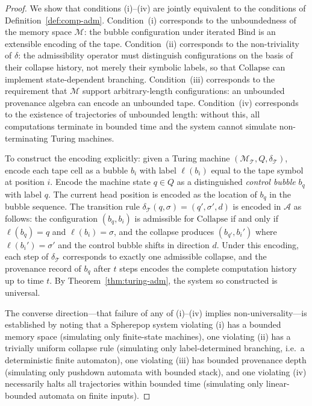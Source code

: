 \documentclass[11pt, oneside]{article}
\numberwithin{equation}{section}
\theoremstyle{rsvpstyle}
\theoremstyle{remark}
\begin{document}
\begin{proof}
We show that conditions (i)--(iv) are jointly equivalent to the conditions of
Definition~\ref{def:comp-adm}. Condition~(i) corresponds to the unboundedness
of the memory space $\mathcal{M}$: the bubble configuration under iterated $\mathrm{Bind}$
is an extensible encoding of the tape. Condition~(ii) corresponds to the non-triviality
of $\delta$: the admissibility operator must distinguish configurations on the basis
of their collapse history, not merely their symbolic labels, so that $\mathrm{Collapse}$
can implement state-dependent branching. Condition~(iii) corresponds to the requirement
that $\mathcal{M}$ support arbitrary-length configurations: an unbounded provenance
algebra can encode an unbounded tape. Condition~(iv) corresponds to the existence
of trajectories of unbounded length: without this, all computations terminate in
bounded time and the system cannot simulate non-terminating Turing machines.

To construct the encoding explicitly: given a Turing machine $(\mathcal{M}_\mathcal{T},
Q, \delta_\mathcal{T})$, encode each tape cell as a bubble $b_i$ with label $\ell(b_i)$
equal to the tape symbol at position $i$. Encode the machine state $q \in Q$ as a
distinguished \emph{control bubble} $b_q$ with label $q$. The current head position
is encoded as the location of $b_q$ in the bubble sequence. The transition rule
$\delta_\mathcal{T}(q, \sigma) = (q', \sigma', d)$ is encoded in $\mathcal{A}$
as follows: the configuration $(b_q, b_i)$ is admissible for $\mathrm{Collapse}$
if and only if $\ell(b_q) = q$ and $\ell(b_i) = \sigma$, and the collapse produces
$(b_{q'}, b_i')$ where $\ell(b_i') = \sigma'$ and the control bubble shifts in
direction $d$. Under this encoding, each step of $\delta_\mathcal{T}$ corresponds
to exactly one admissible collapse, and the provenance record of $b_q$ after $t$
steps encodes the complete computation history up to time $t$. By
Theorem~\ref{thm:turing-adm}, the system so constructed is universal.

The converse direction---that failure of any of (i)--(iv) implies non-universality---is
established by noting that a Spherepop system violating (i) has a bounded memory
space (simulating only finite-state machines), one violating (ii) has a trivially
uniform collapse rule (simulating only label-determined branching, i.e.\ a
deterministic finite automaton), one violating (iii) has bounded provenance depth
(simulating only pushdown automata with bounded stack), and one violating (iv)
necessarily halts all trajectories within bounded time (simulating only linear-bounded
automata on finite inputs).
\end{proof}
\end{document}
